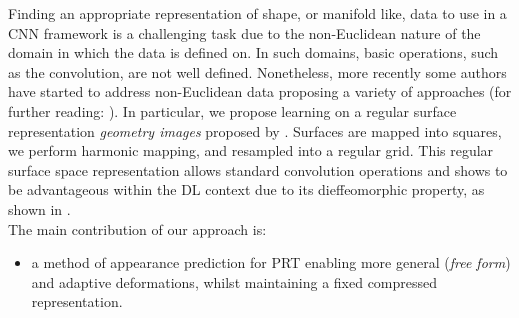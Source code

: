 Finding an appropriate representation of shape, or manifold like, data to use in a CNN framework is a challenging task due to the non-Euclidean nature of the domain in which the data is defined on. In such domains, basic operations, such as the convolution, are not well defined. Nonetheless, more recently some authors have started to address non-Euclidean data proposing a variety of approaches \cite{ShapeNet1, Geometric_deep_learning, CNN_on_Torus} (for further reading: \cite{GeoDeepLearning}).
In particular, we propose learning on a regular surface representation \textit{geometry images} proposed by \citep{gu2002geometry}. Surfaces are mapped into squares, we perform harmonic mapping, and resampled into a regular grid. This regular surface space representation allows standard convolution operations and shows to be advantageous within the DL context due to its dieffeomorphic property, as shown in \cite{sinha2016deep}. 
\\
The main contribution of our approach is: 
\begin{itemize}
\item a method of appearance prediction for PRT enabling more general (\textit{free form}) and adaptive deformations, whilst maintaining a fixed compressed representation.
\end{itemize}

